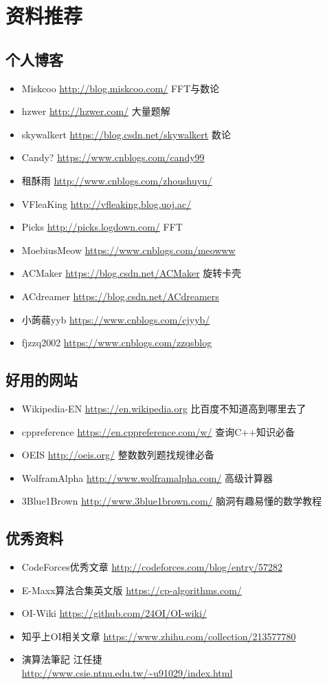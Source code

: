 \chapter{资料推荐}
\section{个人博客}
\begin{itemize}
	\item Miskcoo \url{http://blog.miskcoo.com/} FFT与数论
	\item hzwer \url{http://hzwer.com/} 大量题解
    \item skywalkert \url{https://blog.csdn.net/skywalkert} 数论
    \item Candy? \url{https://www.cnblogs.com/candy99}
    \item 租酥雨 \url{http://www.cnblogs.com/zhoushuyu/}
    \item VFleaKing \url{http://vfleaking.blog.uoj.ac/}
    \item Picks \url{http://picks.logdown.com/} FFT
    \item MoebiusMeow \url{https://www.cnblogs.com/meowww}
    \item ACMaker \url{https://blog.csdn.net/ACMaker} 旋转卡壳
    \item ACdreamer \url{https://blog.csdn.net/ACdreamers}
    \item 小蒟蒻yyb \url{https://www.cnblogs.com/cjyyb/}
    \item fjzzq2002 \url{https://www.cnblogs.com/zzqsblog}
\end{itemize}
\section{好用的网站}
\begin{itemize}
    \item Wikipedia-EN \url{https://en.wikipedia.org} 比百度不知道高到哪里去了
    \item cppreference \url{https://en.cppreference.com/w/} 查询C++知识必备
    \item OEIS \url{http://oeis.org/} 整数数列题找规律必备
    \item WolframAlpha \url{http://www.wolframalpha.com/} 高级计算器
    \item 3Blue1Brown \url{http://www.3blue1brown.com/} 脑洞有趣易懂的数学教程
\end{itemize}
\section{优秀资料}
\begin{itemize}
    \item CodeForces优秀文章 \url{http://codeforces.com/blog/entry/57282}
    \item E-Maxx算法合集英文版 \url{https://cp-algorithms.com/}
    \item OI-Wiki \url{https://github.com/24OI/OI-wiki/}
    \item 知乎上OI相关文章 \url{https://www.zhihu.com/collection/213577780}
    \item 演算法筆記 江任捷\\\url{http://www.csie.ntnu.edu.tw/\~u91029/index.html}
\end{itemize}
